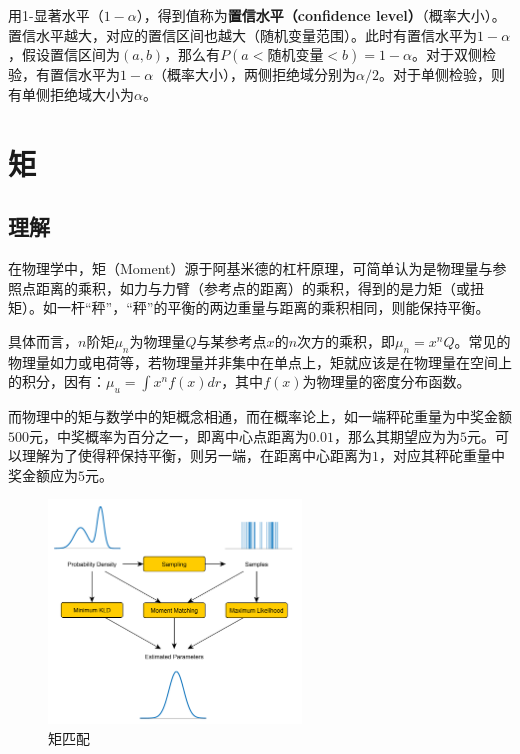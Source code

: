 \documentclass[11pt]{article}
\begin{document}
用1-显著水平（$1-\alpha$），得到值称为\textbf{置信水平（confidence level）}（概率大小）。置信水平越大，对应的置信区间也越大（随机变量范围）。此时有置信水平为$1-\alpha$，假设置信区间为$(a,b)$，那么有$P(a<\text{随机变量}<b)=1-\alpha$。对于双侧检验，有置信水平为$1-\alpha$（概率大小），两侧拒绝域分别为$\alpha/2$。对于单侧检验，则有单侧拒绝域大小为$\alpha$。

\section{矩}

\subsection{理解}

在物理学中，矩（Moment）源于阿基米德的杠杆原理，可简单认为是物理量与参照点距离的乘积，如力与力臂（参考点的距离）的乘积，得到的是力矩（或扭矩）。如一杆“秤”，“秤”的平衡的两边重量与距离的乘积相同，则能保持平衡。

具体而言，$n$阶矩$\mu_n$为物理量$Q$与某参考点$x$的$n$次方的乘积，即$\mu_n = x^n Q$。常见的物理量如力或电荷等，若物理量并非集中在单点上，矩就应该是在物理量在空间上的积分，因有：$\mu_u = \int x^n f(x) dr$，其中$f(x)$为物理量的密度分布函数。

而物理中的矩与数学中的矩概念相通，而在概率论上，如一端秤砣重量为中奖金额$500$元，中奖概率为百分之一，即离中心点距离为$0.01$，那么其期望应为为$5$元。可以理解为了使得秤保持平衡，则另一端，在距离中心距离为$1$，对应其秤砣重量中奖金额应为$5$元。

\begin{figure}[ht!]
    \centering
    \includegraphics[width=0.6\textwidth]{fig/moment-matching.png}
    \caption{矩匹配}
    \label{fig:moment-match}
\end{figure}
\end{document}
